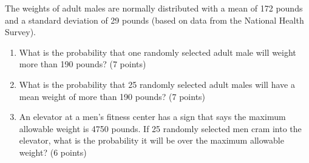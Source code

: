 

\item The weights of adult males are normally distributed with a mean of 172 
pounds and a standard deviation of 29 pounds (based on data from the National
Health Survey). 

\begin{enumerate}
\item What is the probability that one randomly selected adult male will weight 
more than 190 pounds? (7 points)

\vfill
\vfill

\item What is the probability that 25 randomly selected adult males will have a 
mean weight of more than 190 pounds? (7 points)


\vfill
\vfill
\vfill

\item An elevator at a men's fitness center has a sign that says the maximum 
allowable weight is 4750 pounds. If 25 randomly selected men cram into the 
elevator, what is the probability it will be over the maximum allowable weight? 
(6 points)


\vfill
\vfill

\end{enumerate}